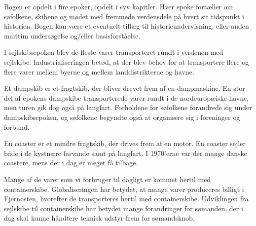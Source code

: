 \begin{Abstract}

    Bogen er opdelt i fire epoker, opdelt i syv kapitler. Hver epoke
    fortæller om søfolkene, skibene og mødet med fremmede verdensdele på
    hvert sit tidspunkt i historien. Bogen kan være et eventuelt tillæg til
    historieundervisning, eller anden maritim undersøgelse og/eller
    basisforståelse.

    I sejlskibsepoken blev de fleste varer transporteret rundt i verdenen
    med sejlskibe. Industrialiseringen betød, at der blev behov for at
    transportere flere og flere varer mellem byerne og mellem
    landdistrikterne og havne.

    Et dampskib er et fragtskib, der bliver drevet frem af en dampmaskine.
    En stor del af epokens dampskibe transporterede varer rundt i de
    nordeuropæiske havne, men turen gik dog også på langfart. Forholdene for
    søfolkene forandrede sig under dampskibsepoken, og søfolkene begyndte
    også at organisere sig i foreninger og forbund.

    En coaster er et mindre fragtskib, der drives frem af en motor. En
    coaster sejler både i de kystnære farvande samt på langfart. I 1970'erne
    var der mange danske coastere, mens der i dag er meget få tilbage.

    Mange af de varer som vi forbruger til dagligt er kommet hertil med
    containerskibe. Globaliseringen har betydet, at mange varer produceres
    billigt i Fjernøsten, hvorefter de transporteres hertil med
    containerskibe. Udviklingen fra sejlskibe til containerskibe har betydet
    mange forandringer for sømanden, der i dag skal kunne håndtere teknisk
    udstyr frem for sømandsknob.
\end{Abstract}
